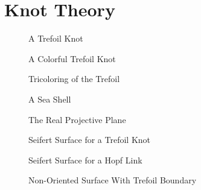 \chapter{Knot Theory}
    \begin{figure}[H]
        \centering
        \caption{A Trefoil Knot}
        \label{fig:Trefoil_Knot}
    \end{figure}
    \begin{figure}[H]
        \centering
        \caption{A Colorful Trefoil Knot}
        \label{fig:Colorful_Trefoil_Knot}
    \end{figure}
    \begin{figure}[H]
        \centering
        \caption{Tricoloring of the Trefoil}
        \label{fig:Trefoil_Tricoloring}
    \end{figure}
    \begin{figure}[H]
        \centering
        \caption{A Sea Shell}
        \label{fig:Sea_Shell}
    \end{figure}
    \begin{figure}[H]
        \centering
        \caption{The Real Projective Plane}
        \label{fig:Real_Projective_Plane}
    \end{figure}
    \begin{figure}[H]
        \centering
        \caption{Seifert Surface for a Trefoil Knot}
        \label{fig:Seifert_Surface_Trefoil}
    \end{figure}
    \begin{figure}[H]
        \centering
        \caption{Seifert Surface for a Hopf Link}
        \label{fig:Seifert_Surface_Hopf_Link}
    \end{figure}
    \begin{figure}[H]
        \centering
        \caption{Non-Oriented Surface With Trefoil Boundary}
        \label{fig:Trefoil_Non_Oriented_Surface}
    \end{figure}